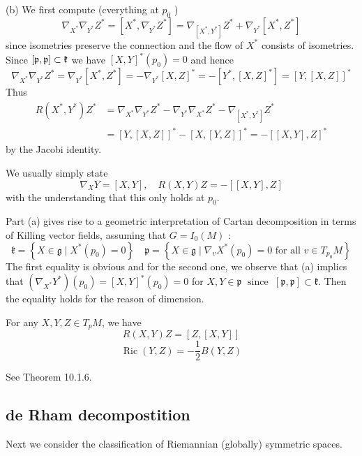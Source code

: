  (b) We first compute (cverything at $p_{0}$ )
 \[
 \nabla_{X^*} \nabla_{Y^*} Z^{*} = \left[X^{*}, \nabla_{Y^*}
 Z^{*}\right] = \nabla_{\left[X^{*}, Y^*\right]}
 Z^{*}+\nabla_{Y^*}\left[X^{*}, Z^{*}\right]
 \]
 since isometries preserve the connection and the flow of $X^{*}$
 consists of isometries. Since $[{\mathfrak p}, {\mathfrak p}] \subset
 \mathfrak{k}$ we have $[X, Y]^{*}\left(p_{0}\right)=0$ and hence
 \[\nabla_{X^*} \nabla_{Y^*} Z^{*}=\nabla_{Y^{*}} \left[X^{*},
 Z^{*}\right]=-\nabla_{Y^*}[X, Z]^{*}=-\left[Y^{*},[X,
 Z]^{*}\right]=[Y,[X, Z]]^{*}
 \]
 Thus
 \[
 \begin{aligned}
 	R\left(X^{*}, Y^{*}\right) Z^{*} &=\nabla_{X^*} \nabla_{Y^*}
 	Z^{*}-\nabla_{Y^*} \nabla_{X^*} Z^{*}-\nabla_{\left[X^{*},
 	Y^{*}\right]} Z^{*} \\
 	&=[Y,[X, Z]]^{*}-[X,[Y, Z]]^{*}=-[[X, Y], Z]^{*}
 \end{aligned}
 \]
 by the Jacobi identity.
\eproof

  We usually simply state
 \[
 \nabla_{X} Y = [X, Y], \quad R(X, Y) Z = -[[X, Y], Z]
 \]
 with the understanding that this only holds at $p_{0}$.

\begin{remark}
	Part (a) gives rise to a geometric interpretation of 
	Cartan decomposition in terms of Killing vector fields,
	assuming that $G={I}_{0}(M)$ :
	\[
	\mathfrak{k} = \left\{X \in \mathfrak{g} \mid X^{*}\left(
	p_{0} \right) = 0 \right\} \quad \mathfrak{p} = \left\{X \in
	\mathfrak{g} \mid \nabla_{v} X^{*}\left(p_{0}\right) = 0
	\text { for all } v \in T_{p_{0}} M \right\}
	\]
	The first equality is obvious and for the second one, we
	observe that (a) implics that $\left( \nabla_{X^{*}} Y^{*}
	\right)\left( p_{0} \right) = [X, Y]^{*}\left( p_{0}
	\right)=0$ for $X, Y \in \mathfrak{p} \operatorname{\ since\
	}[\mathfrak{p}, \mathfrak{p}] \subset \mathfrak{k}$.
	Then the equality holds for the reason of dimension. 
\end{remark}

\begin{corollary}\label{geo2}
	For any $X, Y, Z \in T_{p} M$, we have
	\[
		R(X, Y) Z = [Z,[X, Y]] 
	\]
	\[
		\operatorname{Ric}(Y, Z) = -\frac{1}{2} B(Y, Z)
	\]
\end{corollary}
\bproof
See \cite{Peter} Theorem 10.1.6.
\eproof
\subsection{de Rham decompostition}

Next we consider the classification of  Riemannian (globally)
symmetric spaces.

